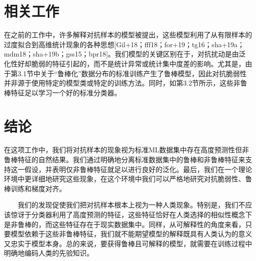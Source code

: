 \documentclass{article}
\begin{document}
\section{相关工作}

在之前的工作中，许多解释对抗样本的模型被提出，这些模型利用了从有限样本的过度拟合到高维统计现象的各种思想[Gil+18；fff18；for+19；tg16；sha+19a；mdm18；sha+19b；gss15；bpr18]。我们模型的关键区别在于，对抗扰动是由泛化性好却脆弱的特征引起的，而不是统计异常或统计集中度差的影响。尤其是，由于第3.1节中关于“鲁棒化”数据分布的标准训练产生了鲁棒模型，因此对抗脆弱性并非源于使用特定的模型类或特定的训练方法。同时，如第3.2节所示，这些非鲁棒特征足以学习一个好的标准分类器。

\section{结论}

在这项工作中，我们将对抗样本的现象视为标准ML数据集中存在高度预测性但非鲁棒特征的自然结果。我们通过明确地分离标准数据集中的鲁棒和非鲁棒特征来支持这一假设，并表明仅非鲁棒特征就足以进行良好的泛化。最后，我们在一个理论环境中更详细地研究这些现象，在这个环境中我们可以严格地研究对抗脆弱性、鲁棒训练和梯度对齐。

\ \ \ \ 我们的发现促使我们把对抗样本根本上视为一种人类现象。特别是，我们不应该惊讶于分类器利用了高度预测的特征，这些特征恰好在人类选择的相似性概念下是非鲁棒的，而这些特征存在于现实数据集中。同样，从可解释性的角度来看，只要模型依赖于这些非鲁棒特征，我们就不能期望模型的解释既具有人类认为的意义又忠实于模型本身。总的来说，要获得鲁棒且可解释的模型，就需要在训练过程中明确地编码人类的先验知识。




\end{document}
